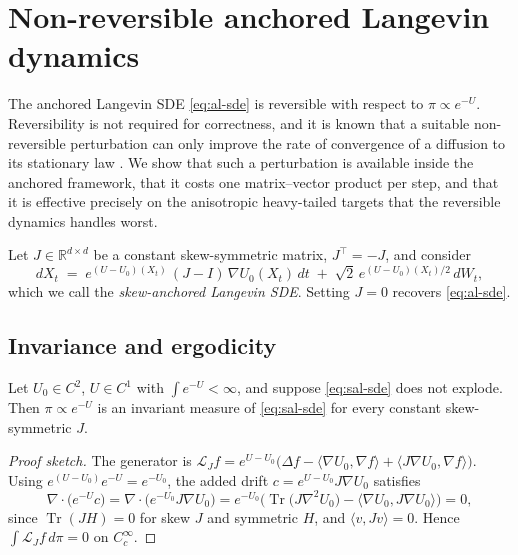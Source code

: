 
\section{Non-reversible anchored Langevin dynamics}
\label{sec:skew}

The anchored Langevin SDE \eqref{eq:al-sde} is reversible with respect to
$\pi\propto e^{-U}$.  Reversibility is not required for correctness, and it is
known that a suitable non-reversible perturbation can only improve the rate of
convergence of a diffusion to its stationary law
\citep{hwang1993accelerating,hwang2005accelerating,lelievre2013optimal,%
duncan2016variance,reybellet2015irreversible}.  We show that such a
perturbation is available inside the anchored framework, that it costs one
matrix--vector product per step, and that it is effective precisely on the
anisotropic heavy-tailed targets that the reversible dynamics handles worst.

Let $J\in\mathbb R^{d\times d}$ be a constant skew-symmetric matrix,
$J^\top=-J$, and consider
\begin{equation}\label{eq:sal-sde}
  dX_t \;=\; e^{(U-U_0)(X_t)}\,(J-I)\,\nabla U_0(X_t)\,dt
        \;+\;\sqrt2\,e^{(U-U_0)(X_t)/2}\,dW_t ,
\end{equation}
which we call the \emph{skew-anchored Langevin SDE}.  Setting $J=0$ recovers
\eqref{eq:al-sde}.

\subsection{Invariance and ergodicity}

\begin{theorem}\label{thm:skew-invariant}
Let $U_0\in C^2$, $U\in C^1$ with $\int e^{-U}<\infty$, and suppose
\eqref{eq:sal-sde} does not explode.  Then $\pi\propto e^{-U}$ is an invariant
measure of \eqref{eq:sal-sde} for every constant skew-symmetric $J$.
\end{theorem}

\begin{proof}[Proof sketch]
The generator is
$\mathcal L_Jf=e^{U-U_0}\big(\Delta f-\langle\nabla U_0,\nabla f\rangle
+\langle J\nabla U_0,\nabla f\rangle\big)$.  Using
$e^{(U-U_0)}e^{-U}=e^{-U_0}$, the added drift $c=e^{U-U_0}J\nabla U_0$ satisfies
\[
  \nabla\!\cdot\!\big(e^{-U}c\big)=\nabla\!\cdot\!\big(e^{-U_0}J\nabla U_0\big)
  =e^{-U_0}\Big(\operatorname{Tr}\big(J\nabla^2U_0\big)-\langle\nabla U_0,J\nabla U_0\rangle\Big)=0,
\]
since $\operatorname{Tr}(JH)=0$ for skew $J$ and symmetric $H$, and
$\langle v,Jv\rangle=0$.  Hence $\int\mathcal L_Jf\,d\pi=0$ on $C_c^\infty$.
\end{proof}


